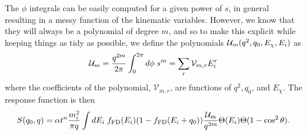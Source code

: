 The $\phi$ integrals can be easily computed for a given power of $s$, in general resulting in a messy function of the kinematic variables. However, we know that they will always be a polynomial of degree $m$, and so to make this explicit while keeping things as tidy as possible, we define the polynomials $\mathcal{U}_m(q^2, q_0, E_\chi, E_i)$ as
\begin{equation}
    \mathcal{U}_m = \frac{q^{2m}}{2\pi}\int_0^{2\pi}d\phi\; s^m = \sum_{r}\mathcal{V}_{m,r}E_i^r
\end{equation}
where the coefficients of the polynomial, $\mathcal{V}_{m,r}$, are functions of $q^2, q_0$, and $E_\chi$.
The response function is then
\begin{equation}
    S(q_0, q) = \alpha t^n \frac{m_i^2}{\pi q}\int dE_i\; f_{\rm FD}(E_i)(1 - f_{\rm FD}(E_i +q_0)) \frac{\mathcal{U}_m}{q^{2m}}\Theta(E_i)\Theta(1 - \cos^2\theta).
\end{equation}

